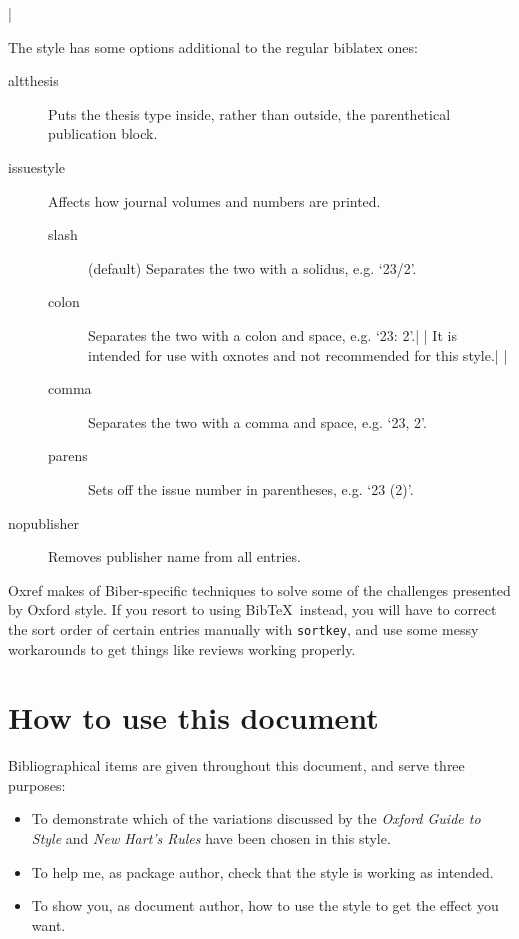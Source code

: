 \documentclass[extrafontsizes,11pt,a4paper,oneside]{memoir}
\begin{document}
\todoc|

The style has some options additional to the regular \textsf{biblatex} ones:

\begin{description}
  \item[altthesis]
  Puts the thesis type inside, rather than outside, the parenthetical publication block.
  \item[issuestyle]
  Affects how journal volumes and numbers are printed.
  \begin{description}
  \item[slash]
  (default) Separates the two with a solidus, e.g. ‘23/2’.
  \item[colon]
  Separates the two with a colon and space, e.g. ‘23: 2’.|
\todoc[oxyear]| It is intended for use with \textsf{oxnotes} and not recommended for this style.|
\todoc|
  \item[comma]
  Separates the two with a comma and space, e.g. ‘23, 2’.
  \item[parens]
  Sets off the issue number in parentheses, e.g. ‘23 (2)’.
  \end{description}
  \item[nopublisher]
  Removes publisher name from all entries.
\end{description}

\textsf{Oxref} makes of Biber-specific techniques to solve some of the challenges
presented by Oxford style. If you resort to using Bib\TeX\ instead,
you will have to correct the sort order of certain entries manually with
\texttt{sortkey}, and use some messy workarounds to get things like reviews
working properly.

\section{How to use this document}

Bibliographical items are given throughout this document, and serve three purposes:

\begin{itemize}
  \item
  To demonstrate which of the variations discussed by the
  \emph{Oxford Guide to Style} and \emph{New Hart's Rules} have been chosen
  in this style.
  \item
  To help me, as package author, check that the style is working as intended.
  \item
  To show you, as document author, how to use the style to get the effect you want.
\end{itemize}
\end{document}
